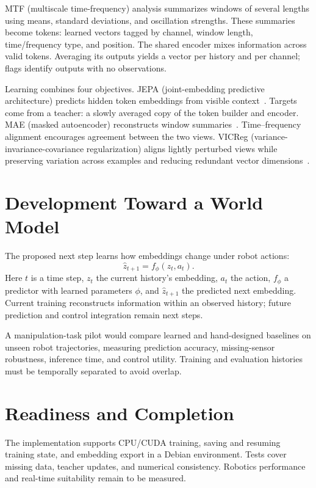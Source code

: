 MTF (multiscale time-frequency) analysis summarizes windows of several lengths
using means, standard deviations, and oscillation strengths. These summaries
become tokens: learned vectors tagged by channel, window length, time/frequency
type, and position. The shared encoder mixes information across valid tokens.
Averaging its outputs yields a vector per history and per channel; flags identify
outputs with no observations.

Learning combines four objectives. JEPA (joint-embedding predictive architecture)
predicts hidden token embeddings from visible context~\cite{assran2023}. Targets
come from a teacher: a slowly averaged copy of the token builder and encoder.
MAE (masked autoencoder) reconstructs window summaries~\cite{he2022}.
Time--frequency alignment encourages agreement between the two views. VICReg
(variance-invariance-covariance regularization) aligns lightly perturbed
views while preserving variation across examples and reducing redundant vector
dimensions~\cite{bardes2022}.

\section{Development Toward a World Model}
The proposed next step learns how embeddings change under robot actions:
\begin{equation}
\widehat{z}_{t+1}=f_{\phi}(z_t,a_t).
\end{equation}
Here $t$ is a time step, $z_t$ the current history's embedding, $a_t$ the action,
$f_{\phi}$ a predictor with learned parameters $\phi$, and $\widehat{z}_{t+1}$
the predicted next embedding. Current training reconstructs information within
an observed history; future prediction and control integration remain next steps.

A manipulation-task pilot would compare learned and hand-designed baselines on
unseen robot trajectories, measuring prediction accuracy, missing-sensor
robustness, inference time, and control utility. Training and evaluation histories
must be temporally separated to avoid overlap.

\section{Readiness and Completion}
The implementation supports CPU/CUDA training, saving and resuming training
state, and embedding export in a Debian environment. Tests cover missing data,
teacher updates, and numerical consistency. Robotics performance and real-time
suitability remain to be measured.

